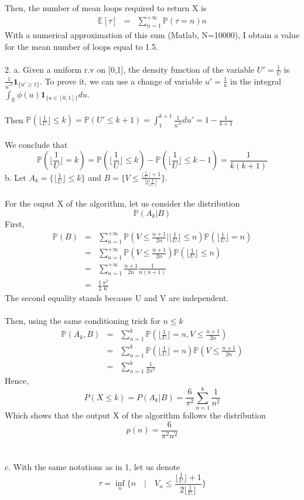 Then, the number of mean loops required to return X is 
\begin{eqnarray*}
	\mathbb{E}[\tau]&=&\sum_{n=1}^{+\infty}\mathbb{P}(\tau=n)n
\end{eqnarray*}
With a numerical approximation of this sum (Matlab, N=10000), I obtain a value for the mean number of loops equal to 1.5.~\\
~\\
2. a. Given a uniform r.v on [0,1], the density function of the variable $U'=\frac{1}{U}$ is $\frac{1}{u'^{2}}\textbf{1}_{\{u' \geq 1\}}$. To prove it, we can use a change of variable $u'=\frac{1}{u}$ in the integral $\int_{\mathbb{R}}\phi(u)\textbf{1}_{\{u \in [0,1] \}}du$.~\\
~\\
Then $\mathbb{P}(\lfloor \frac{1}{U} \rfloor \leq k)=\mathbb{P}( U' \leq k+1)=\int_{1}^{k+1}\frac{1}{u'^{2}}du'=1-\frac{1}{k+1}$~\\
~\\
We conclude that $$\mathbb{P}(\lfloor \frac{1}{U} \rfloor = k)=\mathbb{P}(\lfloor \frac{1}{U} \rfloor \leq k)-\mathbb{P}(\lfloor \frac{1}{U} \rfloor \leq k-1)=\frac{1}{k(k+1)}$$
b. Let $A_{k}=\{\lfloor \frac{1}{U} \rfloor \leq k\}$ and $B=\{V\leq \frac{\lfloor \frac{1}{U} \rfloor +1}{2 \lfloor \frac{1}{U} \rfloor} \}$.~\\
~\\
For the ouput X of the algorithm, let us consider the distribution 
$$\mathbb{P}(A_{k} | B)$$
First, 
\begin{eqnarray*}
\mathbb{P}(B)&=&\sum_{n=1}^{+\infty}\mathbb{P}(V \leq \frac{n+1}{2n} | \lfloor \frac{1}{U} \rfloor \leq n)\mathbb{P}(\lfloor \frac{1}{U} \rfloor=n)\\
&=&\sum_{n=1}^{+\infty} \mathbb{P}(V \leq \frac{n+1}{2n})\mathbb{P} (\lfloor \frac{1}{U} \rfloor \leq n)\\
&=&\sum_{n=1}^{+\infty} \frac{n+1}{2n}\frac{1}{n(n+1)}\\
&=&\frac{1}{2}\frac{\pi^{2}}{6}
\end{eqnarray*}
The second equality stands because U and V are independent.~\\
~\\
Then, using the same conditioning trick for $n \leq k$
\begin{eqnarray*}
	\mathbb{P}(A_{k},B)&=&\sum_{n=1}^{k}\mathbb{P}(\lfloor \frac{1}{U} \rfloor=n, V \leq \frac{n+1}{2n})\\
	&=&\sum_{n=1}^{k}\mathbb{P}(\lfloor \frac{1}{U} \rfloor=n)\mathbb{P}(V \leq \frac{n+1}{2n})\\
	&=&\sum_{n=1}^{k}\frac{1}{2n^{2}}
\end{eqnarray*}
Hence, 
$$P(X \leq k ) = P(A_{k} | B)=\frac{6}{\pi^{2}}\sum_{n=1}^{k}\frac{1}{n^{2}}$$
Which shows that the output X of the algorithm follows the distribution 
$$\boxed{p(n)=\frac{6}{\pi^{2}n^{2}}}$$~\\
~\\
c. With the same notations as in 1, let us denote 
$$\tau=\inf_{n}\{n \quad | \quad V_{n} \leq \frac{\lfloor \frac{1}{U} \rfloor + 1}{2\lfloor \frac{1}{U} \rfloor} \}$$

